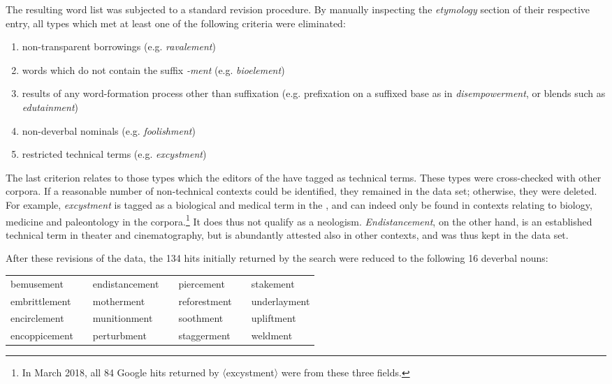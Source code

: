 The resulting word list was subjected to a standard revision procedure. By manually inspecting the \textit{etymology} section of their respective  entry, all types which met at least one of the following criteria were eliminated: 

\begin{enumerate}
	\item non-transparent borrowings (e.g. \textit{ravalement})
	\item words which do not contain the suffix \textit{-ment} (e.g. \textit{bioelement})
	\item results of any word-formation process other than suffixation (e.g. prefixation on a suffixed base as in \textit{disempowerment}, or blends such as \textit{edutainment}) 
	\item non-deverbal nominals (e.g. \textit{foolishment})
	\item restricted technical terms (e.g. \textit{excystment})
\end{enumerate}
The last criterion relates to those types which the editors of the  have tagged as technical terms. These types were cross-checked with other corpora. If a reasonable number of non-technical contexts could be identified, they remained in the data set; otherwise, they were deleted. 
For example, \textit{excystment} is tagged as a biological and medical term in the , and can indeed only be found in contexts relating to biology, medicine and paleontology in the corpora.\footnote{In March 2018, all 84 Google hits returned by 〈excystment〉 were from these three fields.} It does thus not qualify as a neologism. 
\textit{Endistancement}, on the other hand, is an established technical term in theater and cinematography, but is abundantly attested also in other contexts, and was thus kept in the data set. 

After these revisions of the data, the 134 hits initially returned by the  search were reduced to the following 16 deverbal nouns: 

\begin{table}
	\begin{tabular}{lllllll}
		bemusement && endistancement && piercement && stakement \\ 
		embrittlement && motherment && reforestment && underlayment \\ 
		encirclement && munitionment && soothment && upliftment \\ 
		encoppicement && perturbment && staggerment && weldment \\ 
	\end{tabular} 
\end{table}


